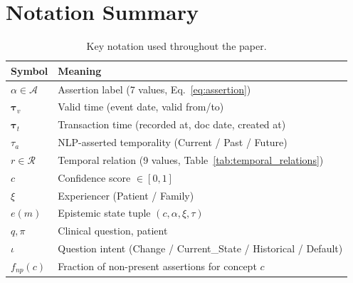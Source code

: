 
\let\oldsection\section
\renewcommand{\section}{\FloatBarrier\oldsection}

\section{Notation Summary}
\label{app:notation}

\begin{table}[ht]
\centering
\small
\begin{tabular}{@{}ll@{}}
\toprule
\textbf{Symbol} & \textbf{Meaning} \\
\midrule
$\alpha \in \mathcal{A}$ & Assertion label (7 values, Eq.~\ref{eq:assertion}) \\
$\boldsymbol{\tau}_v$ & Valid time (event date, valid from/to) \\
$\boldsymbol{\tau}_t$ & Transaction time (recorded at, doc date, created at) \\
$\tau_a$ & NLP-asserted temporality (Current / Past / Future) \\
$r \in \mathcal{R}$ & Temporal relation (9 values, Table~\ref{tab:temporal_relations}) \\
$c$ & Confidence score $\in [0,1]$ \\
$\xi$ & Experiencer (Patient / Family) \\
$e(m)$ & Epistemic state tuple $(c, \alpha, \xi, \tau)$ \\
$q, \pi$ & Clinical question, patient \\
$\iota$ & Question intent (Change / Current\_State / Historical / Default) \\
$f_{\textit{np}}(c)$ & Fraction of non-present assertions for concept $c$ \\
\bottomrule
\end{tabular}
\caption{Key notation used throughout the paper.}
\label{tab:notation}
\end{table}


